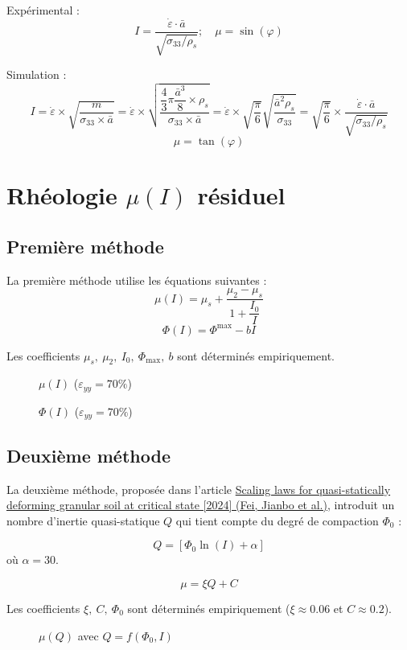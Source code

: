 \documentclass[a4paper,12pt]{report}
\begin{document}
Expérimental : 
\[
I =  \dfrac{\dot{\varepsilon} \cdot \bar{a}}{\sqrt{\sigma_{33}/\rho_s}}; \quad \mu = \sin(\varphi)
\]

Simulation : 
\[
I = \dot{\varepsilon} \times \sqrt {\dfrac{m}{\sigma_{33}\times \bar{a}}}  
= \dot{\varepsilon} \times \sqrt {\dfrac{\dfrac{4}{3} \pi \dfrac{\bar{a}^3}{8} \times \rho_s}{\sigma_{33}\times \bar{a}}} 
= \dot{\varepsilon} \times \sqrt{\dfrac{\pi}{6}} \sqrt {\dfrac{\bar{a}^2 \rho_s}{\sigma_{33}}} 
= \boxed{\sqrt{\dfrac{\pi}{6}}} \times \dfrac{\dot{\varepsilon} \cdot \bar{a}}{\sqrt{\sigma_{33}/\rho_s}}
\]
\[
\mu = \tan(\varphi)
\]

\section{Rhéologie $\mu(I)$ résiduel}

\subsection{Première méthode}

La première méthode utilise les équations suivantes :
\[
\mu(I) = \mu_s + \dfrac{\mu_2 - \mu_s}{1 + \dfrac{I_0}{I}}
\]
\[
\Phi(I) = \Phi^{\max} - bI
\]

Les coefficients $\mu_s,\ \mu_2,\ I_0,\ \Phi_{\max},\ b$ sont déterminés empiriquement.

\begin{figure}
    \centering
    {\small
        
    }
    \caption{$\mu(I)$ ($\varepsilon_{yy} = 70\%$)}
\end{figure}

\begin{figure}
    \centering
    {\small
        
    }
    \caption{$\Phi(I)$ ($\varepsilon_{yy} = 70\%$)}
\end{figure}

\subsection{Deuxième méthode}

La deuxième méthode, proposée dans l'article 
\href{https://link-springer-com.sid2nomade-1.grenet.fr/article/10.1007/s10035-024-01459-7}{Scaling laws for quasi-statically deforming granular soil at critical state [2024] (Fei, Jianbo et al.)}, 
introduit un nombre d'inertie quasi-statique $Q$ qui tient compte du degré de compaction $\Phi_0$ :

\[
Q = \left[ \Phi_0  \ln \left( I \right) + \alpha \right]
\]
où $\alpha = 30$.

\[
\mu = \xi Q + C
\]

Les coefficients $\xi,\ C,\ \Phi_0$ sont déterminés empiriquement ($\xi \approx 0.06$ et $C \approx 0.2$).

\begin{figure}
    \centering
    {\small
        
    }
    \caption{$\mu(Q)$ avec $Q = f(\Phi_0, I)$}
\end{figure}



\end{document}
